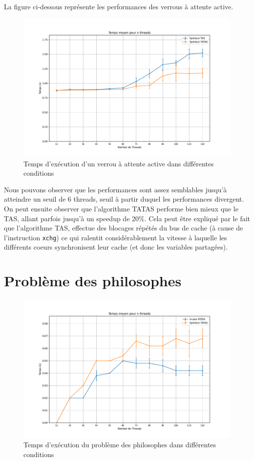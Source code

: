 La figure ci-dessous représente les performances des verrous à attente active.
\begin{figure}[h!]
    \centering
    \includegraphics[scale=0.5]{img/spinlock.pdf}
    \caption{Temps d'exécution d'un verrou à attente active dans différentes conditions}
    \label{pic:spinlock}
\end{figure}

Nous pouvons observer que les performances sont assez semblables jusqu'à atteindre un seuil de 6 threads, seuil à partir duquel les performances divergent.
On peut ensuite observer que l'algorithme TATAS performe bien mieux que le TAS, allant parfois jusqu'à un speedup de 20\%. 
Cela peut être expliqué par le fait que l'algorithme TAS, effectue des blocages répétés du bus de cache (à cause de l'instruction \texttt{xchg}) ce qui ralentit considérablement la vitesse à laquelle les différents coeurs synchronisent leur cache (et donc les variables partagées).

\section{Problème des philosophes}

\begin{figure}[h!]
    \centering
    \includegraphics[scale=0.5]{img/philosophes.pdf}
    \caption{Temps d'exécution du problème des philosophes dans différentes conditions}
    \label{pic:philo}
\end{figure}

